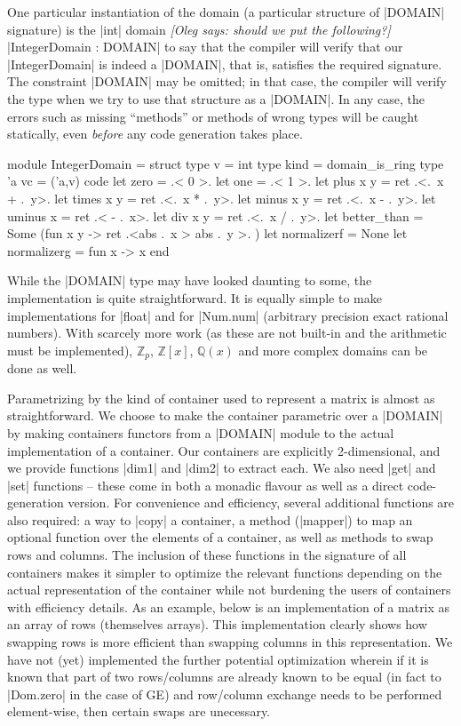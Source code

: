 \documentclass{llncs}
\newcommand{\oleg}[1]{{\it [Oleg says: #1]}}
\begin{document}
One particular instantiation of the domain (a particular structure of
|DOMAIN| signature) is the |int| domain \oleg{should we put the following?}
|IntegerDomain : DOMAIN| to say that the compiler will verify that our
|IntegerDomain| is indeed a |DOMAIN|, that is, satisfies the required
signature. The constraint |DOMAIN| may be omitted; in that case, 
the compiler will verify the type when we try to use that structure as
a |DOMAIN|. In any case, the errors such as missing ``methods'' or 
methods of wrong types will be caught statically, even \emph{before} any code
generation takes place.
\begin{small}
\begin{code}
module IntegerDomain = struct
    type v = int
    type kind = domain_is_ring
    type 'a vc = ('a,v) code
    let zero = .< 0 >.  
    let one = .< 1 >. 
    let plus x y = ret .<.~x + .~y>. 
    let times x y = ret .<.~x * .~y>.
    let minus x y = ret .<.~x - .~y>.
    let uminus x = ret .< - .~x>.
    let div x y = ret .<.~x / .~y>. 
    let better_than = Some (fun x y -> ret .<abs .~x > abs .~y >. )
    let normalizerf = None 
    let normalizerg = fun x -> x
end
\end{code}
\end{small}
\noindent While the |DOMAIN| type may have looked daunting to some, 
the implementation is quite straightforward.  It is equally simple to 
make implementations for |float| and for |Num.num| (arbitrary precision
exact rational numbers).  With scarcely more work (as these are not 
built-in and the arithmetic must be implemented), $\mathbb{Z}_p$,
$\mathbb{Z}\left[x\right]$, $\mathbb{Q}\left(x\right)$ and more
complex domains can be done as well.

Parametrizing by the kind of container used to represent a matrix is
almost as straightforward.  We choose to make the container parametric
over a |DOMAIN| by making containers functors from a |DOMAIN| module
to the actual implementation of a container.  Our containers are
explicitly 2-dimensional, and we provide functions |dim1| and |dim2|
to extract each.  We also need |get| and |set| functions -- these come
in both a monadic flavour as well as a direct code-generation version.
For convenience and efficiency, several additional functions are also
required: a way to |copy| a container, a method (|mapper|) to map an
optional function over the elements of a container, as well as methods
to swap rows and columns.  The inclusion of these functions in the 
signature of all containers makes it simpler to optimize the relevant
functions depending on the actual representation of the container
while not burdening the users of containers with efficiency details.
As an example, below is an implementation of a matrix as an
array of rows (themselves arrays).  This implementation clearly shows
how swapping rows is more efficient than swapping columns in this
representation.  We have not (yet) implemented the further potential
optimization wherein if it is known that part of two rows/columns are already
known to be equal (in fact to |Dom.zero| in the case of GE) and
row/column exchange needs to be performed element-wise, then certain
swaps are unecessary.
\end{document}
